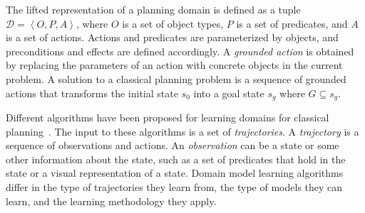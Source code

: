 \documentclass[letterpaper]{article} %
\newcommand{\tuple}[1]{\ensuremath{\left \langle #1 \right \rangle }}
\newif\ifaddcomments
\newcommand{\todo}[1]{\ifaddcomments{\textcolor{red}{[TODO: #1]}}\fi}
\newcommand{\roni}[1]{\ifaddcomments{\textcolor{red}{[Roni: #1]}}\fi}
\newcommand{\yarin}[1]{\ifaddcomments{\textcolor{teal}{[Yarin: #1]}}\fi}
\newcommand{\cm}[1]{\ifaddcomments{\textcolor{olive}{[Christian: #1]}}\fi}
\begin{document}
The lifted representation of a planning domain is defined as a tuple $\mathcal{D} = \tuple{O, P, A}$, where $O$ is a set of object types, $P$ is a set of predicates, and $A$ is a set of actions. Actions and predicates are parameterized by objects, and preconditions and effects are defined accordingly.
A \emph{grounded action} is obtained by replacing the parameters of an action with concrete objects in the current problem. 
A solution to a classical planning problem is a sequence of grounded actions that transforms the initial state $s_0$ into a goal state $s_g$ where $G\subseteq s_g$. 

Different algorithms have been proposed for learning domains for classical planning~\citep{macq,aineto2019learning,jimenez2012review}. 
The input to these algorithms is a set of \emph{trajectories}. 
A \emph{trajectory} is a sequence of observations and actions. 
An \emph{observation} can be a state or some other information about the state, 
such as a set of predicates that hold in the state or a visual representation of a state. 
Domain model learning algorithms differ in the type of trajectories they learn from, the type of models they can learn, 
and the learning methodology they apply. 


\end{document}
